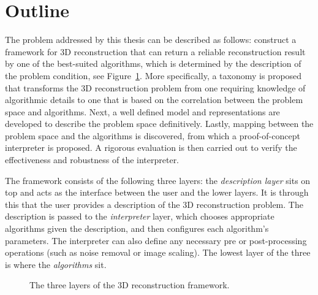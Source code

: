 
\section{Outline}
The problem addressed by this thesis can be described as follows: construct a framework for 3D reconstruction that can return a reliable reconstruction result by one of the best-suited algorithms, which is determined by the description of the problem condition, see Figure~\ref{fig:framework_overview}. More specifically, a taxonomy is proposed that transforms the 3D reconstruction problem from one requiring knowledge of algorithmic details to one that is based on the correlation between the problem space and algorithms. Next, a well defined model and representations are developed to describe the problem space definitively. Lastly, mapping between the problem space and the algorithms is discovered, from which a proof-of-concept interpreter is proposed. A rigorous evaluation is then carried out to verify the effectiveness and robustness of the interpreter. 

The framework consists of the following three layers: the \textit{description layer} sits on top and acts as the interface between the user and the lower layers. It is through this that the user provides a description of the 3D reconstruction problem. The description is passed to the \textit{interpreter} layer, which chooses appropriate algorithms given the description, and then configures each algorithm's parameters. The interpreter can also define any necessary pre or post-processing operations (such as noise removal or image scaling). The lowest layer of the three is where the \textit{algorithms} sit.
\begin{figure}[!htbp]
\centering
{}
\caption{The three layers of the 3D reconstruction framework.}
\label{fig:framework_overview}
\end{figure}

